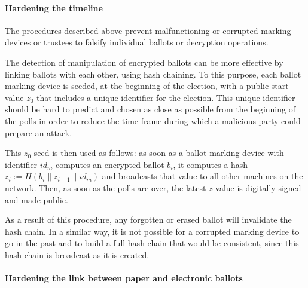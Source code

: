 \paragraph{Hardening the timeline}
\label{sec:hard-timeline}

The procedures described above prevent malfunctioning or corrupted
marking devices or trustees to falsify individual ballots or decryption
operations.

The detection of manipulation of encrypted ballots can be more
effective by linking ballots with each other, using hash chaining.  To
this purpose, each ballot marking device is seeded, at the beginning
of the election, with a public start value $z_0$ that includes a
unique identifier for the election. This unique identifier should be
hard to predict and chosen as close as possible from the beginning of
the polls in order to reduce the time frame during which a malicious
party could prepare an attack.

This $z_0$ seed is then used as follows: as soon as a ballot marking
device with identifier $id_m$ computes an encrypted ballot $b_i$, it
computes a hash $z_i := H(b_i \| z_{i-1} \| id_m)$ and broadcasts that
value to all other machines on the network. Then, as soon as the polls
are over, the latest $z$ value is digitally signed and made public.

As a result of this procedure, any forgotten or erased ballot will
invalidate the hash chain. In a similar way, it is not possible for a
corrupted marking device to go in the past and to build a full hash
chain that would be consistent, since this hash chain is broadcast as
it is created.

\paragraph{Hardening the link between paper and electronic ballots}
\label{sec:hard-link-betw}


